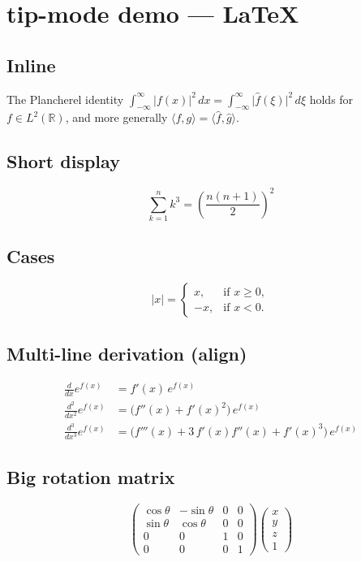 \documentclass{article}
\begin{document}
\section*{tip-mode demo --- LaTeX}

\subsection*{Inline}

The Plancherel identity
$\int_{-\infty}^{\infty} \lvert f(x)\rvert^2\,dx
  = \int_{-\infty}^{\infty} \lvert \hat f(\xi)\rvert^2\,d\xi$
holds for $f \in L^2(\mathbb{R})$, and more generally
$\langle f, g\rangle = \langle \hat f, \hat g\rangle$.

\subsection*{Short display}

\[ \sum_{k=1}^n k^3 = \left( \frac{n(n+1)}{2} \right)^2 \]

\subsection*{Cases}

\[ \lvert x\rvert = \begin{cases}
    x,  & \text{if } x \ge 0, \\
    -x, & \text{if } x < 0.
\end{cases} \]

\subsection*{Multi-line derivation (align)}

\begin{align*}
  \frac{d}{dx} e^{f(x)}
    &= f'(x)\, e^{f(x)} \\
  \frac{d^2}{dx^2} e^{f(x)}
    &= \bigl(f''(x) + f'(x)^2\bigr)\, e^{f(x)} \\
  \frac{d^3}{dx^3} e^{f(x)}
    &= \bigl(f'''(x) + 3\,f'(x)f''(x) + f'(x)^3\bigr)\, e^{f(x)}
\end{align*}

\subsection*{Big rotation matrix}

\[ \begin{pmatrix}
    \cos\theta & -\sin\theta & 0 & 0 \\
    \sin\theta &  \cos\theta & 0 & 0 \\
    0          &  0          & 1 & 0 \\
    0          &  0          & 0 & 1
\end{pmatrix}
\begin{pmatrix} x \\ y \\ z \\ 1 \end{pmatrix} \]
\end{document}
